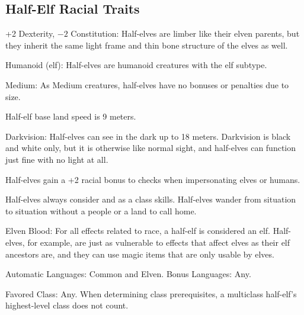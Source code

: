 \subsection{Half-Elf Racial Traits}
\begin{itemize*}
    \item +2 Dexterity, $-2$ Constitution: Half-elves are limber like their elven parents, but they inherit the same light frame and thin bone structure of the elves as well.
    \item Humanoid (elf): Half-elves are humanoid creatures with the elf subtype.
    \item Medium: As Medium creatures, half-elves have no bonuses or penalties due to size.
    \item Half-elf base land speed is 9 meters.
    \item Darkvision: Half-elves can see in the dark up to 18 meters. Darkvision is black and white only, but it is otherwise like normal sight, and half-elves can function just fine with no light at all.
    \item Half-elves gain a +2 racial bonus to  checks when impersonating elves or humans.
    \item Half-elves always consider  and  as a class skills. Half-elves wander from situation to situation without a people or a land to call home.
    \item Elven Blood: For all effects related to race, a half-elf is considered an elf. Half-elves, for example, are just as vulnerable to effects that affect elves as their elf ancestors are, and they can use magic items that are only usable by elves.
    \item Automatic Languages: Common and Elven. Bonus Languages: Any.
    \item Favored Class: Any. When determining class prerequisites, a multiclass half-elf's highest-level class does not count.
\end{itemize*}
